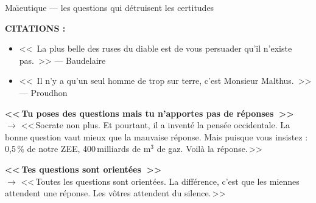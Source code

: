 \documentclass[a4paper,11pt]{article}
\begin{document}
\begin{fichebleu}{Ma\"{\i}eutique --- les questions qui d\'{e}truisent les certitudes}
\vspace{0.3cm}

\begin{center}
\end{center}

\vspace{0.3cm}
\textbf{CITATIONS :}
\begin{itemize}[nosep, font=\itshape]
  \item <<~La plus belle des ruses du diable est de vous persuader qu'il n'existe pas.~>> --- Baudelaire
  \item <<~Il n'y a qu'un seul homme de trop sur terre, c'est Monsieur Malthus.~>> --- Proudhon
\end{itemize}

\begin{contrearg}
\textbf{<<\,Tu poses des questions mais tu n'apportes pas de r\'{e}ponses~>>}\\
$\rightarrow$ <<\,Socrate non plus. Et pourtant, il a invent\'{e} la pens\'{e}e occidentale. La bonne question vaut mieux que la mauvaise r\'{e}ponse. Mais puisque vous insistez : 0{,}5\,\% de notre ZEE, 400\,milliards de m$^3$ de gaz. Voil\`{a} la r\'{e}ponse.\,>>

\textbf{<<\,Tes questions sont orient\'{e}es~>>}\\
$\rightarrow$ <<\,Toutes les questions sont orient\'{e}es. La diff\'{e}rence, c'est que les miennes attendent une r\'{e}ponse. Les v\^{o}tres attendent du silence.\,>>
\end{contrearg}


\end{fichebleu}
\end{document}
